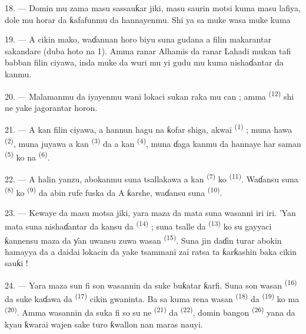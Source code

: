 18. --- Domin mu zama masu sassauƙar jiki, masu saurin motsi kuma
masu lafiya, dole mu horar da ƙafafunmu da hannayenmu. Shi ya sa muke
wasa muke kuma 

19. --- A cikin mako, waɗannan horo biyu suna gudana a filin
makarantar sakandare (duba hoto na 1). Amma ranar Alhamis da ranar
Lahadi mukan tafi babban filin ciyawa, inda muke da wuri mu yi gudu mu
kuma nishaɗantar da kanmu.

20. --- Malamanmu da iyayenmu wani lokaci sukan raka mu can ; amma
\textsuperscript{(12)} shi ne yake jagorantar
horon.

21. --- A kan filin ciyawa, a hannun hagu na ƙofar shiga, akwai
\textsuperscript{(1)} ; muna hawa
\textsuperscript{(2)}, muna juyawa a kan
\textsuperscript{(3)} da a kan \textsuperscript{(4)}, muna ɗaga kanmu da hannaye har saman
\textsuperscript{(5)} ko na \textsuperscript{(6)}.

22. --- A halin yanzu, abokanmu suna tsallakawa a kan \textsuperscript{(7)} ko \textsuperscript{(11)}. Waɗansu suna \textsuperscript{(8)}
ko \textsuperscript{(9)} da abin rufe fuska da
 A ƙarshe, waɗansu suna \textsuperscript{(10)}.

\VUsaut{4.6mm}
\VUsaut{3.0mm}

23. --- Kewaye da masu motsa jiki, yara maza da mata suna wasanni iri
iri. ’Yan mata suna nishaɗantar da kansu da \textsuperscript{(14)} ; suna tsalle da \textsuperscript{(13)} ko su gayyaci ƙannensu maza da ƴan
uwansu zuwa wasan \textsuperscript{(15)}. Suna jin daɗin
turar  abokin hamayya da  a daidai lokacin da yake tsammani zai ratsa ta ƙarƙashin
baka cikin sauƙi !

24. --- Yara maza sun fi son wasannin da suke buƙatar ƙarfi. Suna son
wasan \textsuperscript{(16)} da suke kaɗawa da
\textsuperscript{(17)} cikin gwaninta. Ba sa kuma rena
wasan \textsuperscript{(18)} da \textsuperscript{(19)} ko ma \textsuperscript{(20)}. Amma wasannin da suka fi so su ne
\textsuperscript{(21)} da \textsuperscript{(22)}, domin bangon \textsuperscript{(26)} yana da kyau ƙwarai wajen sake turo
ƙwallon nan maras nauyi.

